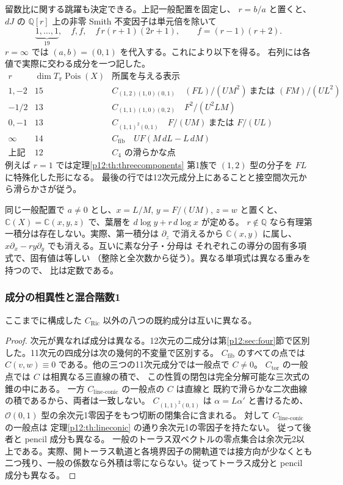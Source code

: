 留数比に関する跳躍も決定できる。上記一般配置を固定し、
$r=b/a$ と置くと、$dJ$ の $\mathbb Q[r]$ 上の非零 Smith 不変因子は単元倍を除いて
\[
 \underbrace{1,\ldots,1}_{19},\quad f,f,\quad
 f\,r(r+1)(2r+1),\qquad f=(r-1)(r+2).
\]
$r=\infty$ では $(a,b)=(0,1)$ を代入する。これにより以下を得る。
右列には各値で実際に交わる成分を一つ記した。
\[
\begin{array}{c|c|l}
 r &\dim T_\pi\operatorname{Pois}(X)& \text{所属を与える表示}\\\hline
 1,-2&15&C_{(1,2)(1,0)(0,1)}\quad (F L)/(U M^2)\ \text{または }(F M)/(U L^2)\\
 -1/2&13&C_{(1,1)(1,0)(0,2)}\quad F^2/(U^2 L M)\\
 0,-1&13&C_{(1,1)^2(0,1)}\quad F/(U M)\ \text{または }F/(U L)\\
 \infty&14&C_{\mathrm{fib}}\quad U F (M\,dL-L\,dM)\\
 \text{上記以外}&12& C_4\text{ の滑らかな点}
\end{array}
\]
例えば $r=1$ では定理\ref{p12:th:threecomponents} 第1族で
$(1,2)$ 型の分子を $FL$ に特殊化した形になる。
最後の行では12次元成分上にあることと接空間次元から滑らかさが従う。

同じ一般配置で $a\ne0$ とし、$x=L/M$, $y=F/(UM)$, $z=w$ と置くと、
$\mathbb C(X)=\mathbb C(x,y,z)$ で、葉層を $d\log y+r\,d\log x$ が定める。
$r\notin\mathbb Q$ なら有理第一積分は存在しない。実際、第一積分は
$\partial_z$ で消えるから $\mathbb C(x,y)$ に属し、
$x\partial_x-r y\partial_y$ でも消える。互いに素な分子・分母は
それぞれこの導分の固有多項式で、固有値は等しい
（整除と全次数から従う）。異なる単項式は異なる重みを持つので、
比は定数である。


\subsubsection{成分の相異性と混合階数1}
\begin{proposition}\label{p12:prop:distinct}
ここまでに構成した $C_{\mathrm{Ric}}$ 以外の八つの既約成分は互いに異なる。
\end{proposition}
\begin{proof}
次元が異なれば成分は異なる。12次元の二成分は第\ref{p12:sec:four}節で区別した。11次元の四成分は次の幾何的不変量で区別する。
$C_{\mathrm{fib}}$ のすべての点では
$C(v,w)\equiv0$ である。他の三つの11次元成分では一般点で $C\ne0$。
$C_{\mathrm{tor}}$ の一般点では $C$ は相異なる三直線の積で、
この性質の閉包は完全分解可能な三次式の錐の中にある。
一方 $C_{\mathrm{line\text{-}conic}}$ の一般点の $C$ は直線と
既約で滑らかな二次曲線の積であるから、両者は一致しない。
$C_{(1,1)^2(0,1)}$ は $\alpha=L\alpha'$ と書けるため、
$\mathcal O(0,1)$ 型の余次元1零因子をもつ切断の閉集合に含まれる。
対して $C_{\mathrm{line\text{-}conic}}$ の一般点は
定理\ref{p12:th:lineconic} の通り余次元1の零因子を持たない。
従って後者と pencil 成分も異なる。
一般のトーラス双ベクトルの零点集合は余次元2以上である。実際、開トーラス軌道と各境界因子の開軌道では接方向が少なくとも二つ残り、一般の係数なら外積は零にならない。従ってトーラス成分と pencil 成分も異なる。
\end{proof}


